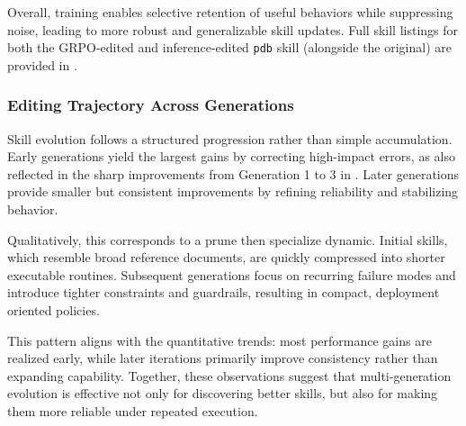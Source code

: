 Overall, training enables selective retention of useful behaviors while suppressing noise, leading to more robust and generalizable skill updates. Full skill listings for both the GRPO-edited and inference-edited \texttt{pdb} skill (alongside the original) are provided in .

\subsubsection{Editing Trajectory Across Generations}

Skill evolution follows a structured progression rather than simple accumulation. Early generations yield the largest gains by correcting high-impact errors, as also reflected in the sharp improvements from Generation 1 to 3 in . Later generations provide smaller but consistent improvements by refining reliability and stabilizing behavior.

Qualitatively, this corresponds to a prune then specialize dynamic. Initial skills, which resemble broad reference documents, are quickly compressed into shorter executable routines. Subsequent generations focus on recurring failure modes and introduce tighter constraints and guardrails, resulting in compact, deployment oriented policies.

This pattern aligns with the quantitative trends: most performance gains are realized early, while later iterations primarily improve consistency rather than expanding capability. Together, these observations suggest that multi-generation evolution is effective not only for discovering better skills, but also for making them more reliable under repeated execution.
